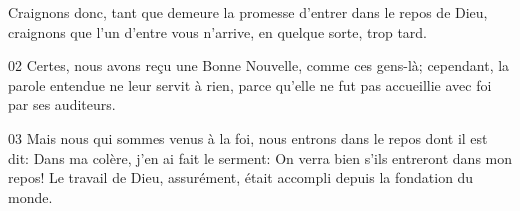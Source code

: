 Craignons donc, tant que demeure la promesse d’entrer dans le repos de Dieu, craignons que l’un d’entre vous n’arrive, en quelque sorte, trop tard.

02 Certes, nous avons reçu une Bonne Nouvelle, comme ces gens-là; cependant, la parole entendue ne leur servit à rien, parce qu’elle ne fut pas accueillie avec foi par ses auditeurs.

03 Mais nous qui sommes venus à la foi, nous entrons dans le repos dont il est dit: Dans ma colère, j’en ai fait le serment: On verra bien s’ils entreront dans mon repos! Le travail de Dieu, assurément, était accompli depuis la fondation du monde.
